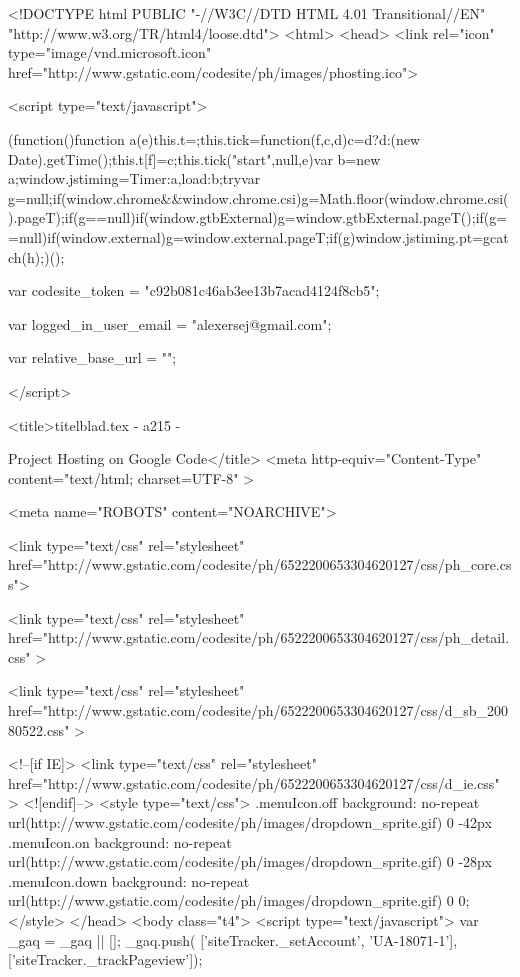 


<!DOCTYPE html PUBLIC "-//W3C//DTD HTML 4.01 Transitional//EN" "http://www.w3.org/TR/html4/loose.dtd">
<html>
<head>
 <link rel="icon" type="image/vnd.microsoft.icon" href="http://www.gstatic.com/codesite/ph/images/phosting.ico">
 
 <script type="text/javascript">
 
 (function(){function a(e){this.t={};this.tick=function(f,c,d){c=d?d:(new Date).getTime();this.t[f]=c};this.tick("start",null,e)}var b=new a;window.jstiming={Timer:a,load:b};try{var g=null;if(window.chrome&&window.chrome.csi)g=Math.floor(window.chrome.csi().pageT);if(g==null)if(window.gtbExternal)g=window.gtbExternal.pageT();if(g==null)if(window.external)g=window.external.pageT;if(g)window.jstiming.pt=g}catch(h){};})();

 
 
 
 var codesite_token = "c92b081c46ab3ee13b7acad4124f8cb5";
 
 
 var logged_in_user_email = "alexersej@gmail.com";
 
 
 var relative_base_url = "";
 
 </script>
 
 
 <title>titelblad.tex - 
 a215 -
 
 Project Hosting on Google Code</title>
 <meta http-equiv="Content-Type" content="text/html; charset=UTF-8" >
 
 <meta name="ROBOTS" content="NOARCHIVE">
 
 <link type="text/css" rel="stylesheet" href="http://www.gstatic.com/codesite/ph/6522200653304620127/css/ph_core.css">
 
 <link type="text/css" rel="stylesheet" href="http://www.gstatic.com/codesite/ph/6522200653304620127/css/ph_detail.css" >
 
 
 <link type="text/css" rel="stylesheet" href="http://www.gstatic.com/codesite/ph/6522200653304620127/css/d_sb_20080522.css" >
 
 
 
<!--[if IE]>
 <link type="text/css" rel="stylesheet" href="http://www.gstatic.com/codesite/ph/6522200653304620127/css/d_ie.css" >
<![endif]-->
 <style type="text/css">
 .menuIcon.off { background: no-repeat url(http://www.gstatic.com/codesite/ph/images/dropdown_sprite.gif) 0 -42px }
 .menuIcon.on { background: no-repeat url(http://www.gstatic.com/codesite/ph/images/dropdown_sprite.gif) 0 -28px }
 .menuIcon.down { background: no-repeat url(http://www.gstatic.com/codesite/ph/images/dropdown_sprite.gif) 0 0; }
 </style>
</head>
<body class="t4">
 <script type="text/javascript">
 var _gaq = _gaq || [];
 _gaq.push(
 ['siteTracker._setAccount', 'UA-18071-1'],
 ['siteTracker._trackPageview']);
 
